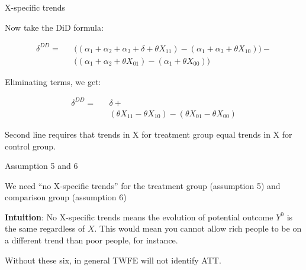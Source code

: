 \documentclass{beamer}
\begin{document}
\begin{frame}{X-specific trends}

Now take the DiD formula:

\begin{eqnarray*}
\delta^{DD} = &&\bigg ( (\alpha_1 + \alpha_2 + \alpha_3 + \delta + \theta X_{11} ) - (\alpha_1 + \alpha_3 + \theta X_{10} ) \bigg )- \\
&& \bigg ( (\alpha_1 + \alpha_2 + \theta X_{01}) - (\alpha_1 + \theta X_{00}) \bigg )
\end{eqnarray*}

\bigskip

Eliminating terms, we get:

\begin{eqnarray*}
\delta^{DD} = &&\delta + \\
&& (\theta X_{11} - \theta X_{10} ) - (\theta X_{01} - \theta X_{00} )
\end{eqnarray*}

\bigskip

Second line requires that trends in X for treatment group equal trends in X for control group.

\end{frame}


\begin{frame}{Assumption 5 and 6}

We need ``no X-specific trends'' for the treatment group (assumption 5) and comparison group (assumption 6)

\bigskip

\textbf{Intuition}: No X-specific trends means the evolution of potential outcome $Y^0$ is the same regardless of $X$. This would mean you cannot allow rich people to be on a different trend than poor people, for instance.

\bigskip

Without these six, in general TWFE will not identify ATT.

\end{frame}
\end{document}
